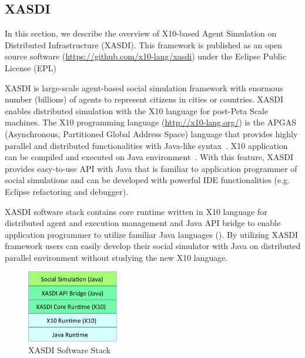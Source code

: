 \subsection{XASDI}
\label{ss:XASDI}

In this section, we describe the overview of X10-based Agent Simulation on Distributed Infrastructure (XASDI).
This framework is published as an open source software (\url{https://github.com/x10-lang/xasdi}) under the Eclipse Public License (EPL)

XASDI is large-scale agent-based social simulation framework with enormous number (billions) of agents to represent citizens in cities or countries.
XASDI enables distributed simulation with the X10 language for post-Peta Scale machines.
The X10 programming language (\url{http://x10-lang.org/}) is the APGAS (Asynchronous, Partitioned Global Address Space) language that provides highly parallel and distributed functionalities with Java-like syntax~\cite{Charles:2005:XOA:1094811.1094852}. X10 application can be compiled and executed on Java environment~\cite{Takeuchi:2011:CXJ:2212736.2212739,Takeuchi:2013:JIM:2481268.2481278}.
With this feature, XASDI provides easy-to-use API with Java that is familiar to application programmer of social simulations and can be developed with powerful IDE functionalities (e.g. Eclipse refactoring and debugger).

XASDI software stack contains core runtime written in X10 language for distributed agent and execution management and Java API bridge to enable application programmer to utilize familiar Java languages
().
By utilizing XASDI framework users can easily develop their social simulator with Java on distributed parallel environment without studying the new X10 language.

\begin{figure}[h]
  \centering
  \includegraphics[width=4cm]{Figs.mizuta/xasdistack.pdf}
  \caption{XASDI Software Stack}
  \label{fig:Figs.mizuta/xasdistack}
\end{figure}


